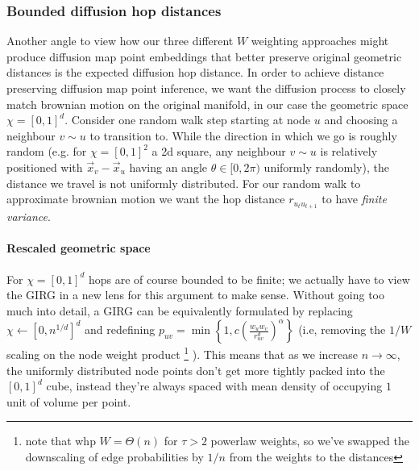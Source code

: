 \subsubsection{Bounded diffusion hop distances}
Another angle to view how our three different $W$ weighting approaches might produce diffusion map point embeddings that better preserve original geometric distances is the expected diffusion hop distance. In order to achieve distance preserving diffusion map point inference, we want the diffusion process to closely match brownian motion on the original manifold, in our case the geometric space $\chi = [0,1]^d$. Consider one random walk step starting at node $u$ and choosing a neighbour $v \sim u$ to transition to. While the direction in which we go is roughly random (e.g. for $\chi=[0,1]^2$ a 2d square, any neighbour $v \sim u$ is relatively positioned with $\vec{x}_v - \vec{x}_u$ having an angle $\theta \in [0, 2\pi)$ uniformly randomly), the distance we travel is not uniformly distributed. For our random walk to approximate brownian motion we want the hop distance $r_{u_t u_{t+1}}$ to have \textit{finite variance}. 

\paragraph{Rescaled geometric space}
For $\chi = [0,1]^d$ hops are of course bounded to be finite; we actually have to view the GIRG in a new lens for this argument to make sense.
Without going too much into detail, a GIRG can be equivalently formulated by replacing $\chi \gets [0, n^{1/d}]^d$ and redefining $p_{uv} = \min \left \{ 1, c \left ( \frac{w_u w_v}{r_{uv}^d} \right )^\alpha \right \}$ (i.e, removing the $1/W$ scaling on the node weight product
  \footnote{note that whp $W = \Theta(n)$ for $\tau > 2$ powerlaw weights, so we've swapped the downscaling of edge probabilities by $1/n$ from the weights to the distances}
).
This means that as we increase $n \to \infty$, the uniformly distributed node points don't get more tightly packed into the $[0, 1]^d$ cube, instead they're always spaced with mean density of occupying $1$ unit of volume per point.



